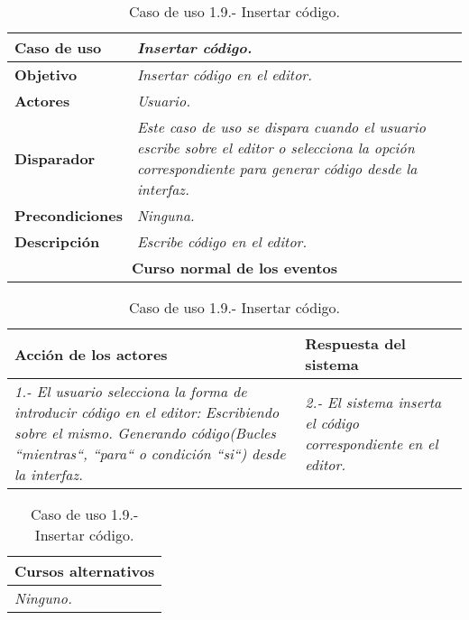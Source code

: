    \begin{table}[!ht] %
      \centering
      \begin{tabular}{|p{4cm}|p{11.5cm}|}
      \hline
      \textbf{Caso de uso} & \textit{Insertar código.}\\ \hline
      \textbf{Objetivo} & \textit{Insertar código en el editor.}\\ \hline
      \textbf{Actores} & \textit{Usuario.}\\ \hline
      \textbf{Disparador} & \textit{Este caso de uso se dispara cuando el usuario escribe sobre el editor o selecciona la opción correspondiente
                                 para generar código desde la interfaz.}\\ \hline
      \textbf{Precondiciones} & \textit{Ninguna.}\\ \hline
      \textbf{Descripción} & \textit{Escribe código en el editor.}\\ \hline 
      \multicolumn{2}{|c|}{\textbf{Curso normal de los eventos}}\\ \hline
    \end{tabular}
    \begin{tabular}{|p{7.75cm}|p{7.75cm}|}
      \hspace{2cm}\textbf{Acción de los actores} & \hspace{1.75cm}\textbf{Respuesta del sistema}\\ \hline
      \textit{1.- El usuario selecciona la forma de introducir código en el editor:} \textit{  Escribiendo sobre el mismo.} \textit{  Generando
            código(Bucles ``mientras``, ``para`` o condición ``si``) desde la interfaz.} & \textit{2.- El sistema inserta el código correspondiente
                                                                                             en el editor.}\\ \hline
    \end{tabular}
    \begin{tabular}{|p{15.9cm}|}
      \hspace{6cm}\textbf{Cursos alternativos}\\ \hline     
      \textit{Ninguno.} \\ \hline
    \end{tabular}
    \caption{Caso de uso 1.9.- Insertar código.}
   \end{table}


